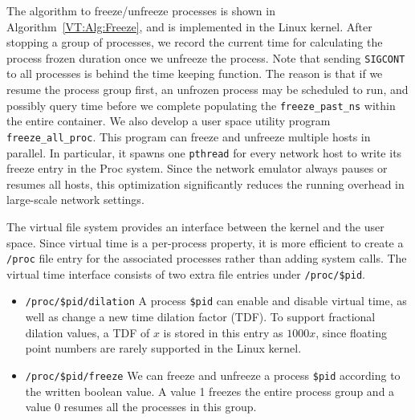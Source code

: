 The algorithm to freeze/unfreeze processes is shown in Algorithm~\ref{VT:Alg:Freeze},
and is implemented in the Linux kernel.
After stopping a group of processes, we record the  current time for calculating the process frozen duration once we unfreeze the process.
Note that sending \texttt{SIGCONT} to all processes is behind the time keeping function.
The reason is that if we resume the process group first, an unfrozen process may be scheduled to run,
and possibly query time before we complete populating the \texttt{freeze\_past\_ns} within the entire container.
We also develop a user space utility program \texttt{freeze\_all\_proc}.
This program can freeze and unfreeze multiple hosts in parallel.
In particular, it spawns one \texttt{pthread} for every network host to write its freeze entry in the Proc system.
Since the network emulator always pauses or resumes all hosts, this optimization significantly reduces the running overhead in large-scale network settings.

The virtual file system provides an interface between the kernel and the user space.
Since virtual time is a per-process property, it is more efficient to create a \texttt{/proc}
file entry for the associated processes rather than adding system calls.
The virtual time interface consists of two extra file entries under \texttt{/proc/\$pid}.
\begin{itemize}
    \item \texttt{/proc/\$pid/dilation} A process \texttt{\$pid} can enable and disable virtual time, as well as change a new time dilation factor (TDF).
        To support fractional dilation values, a TDF of $x$ is stored in this entry as $1000x$,  since floating point numbers are rarely supported in the Linux kernel.
    \item \texttt{/proc/\$pid/freeze} We can freeze and unfreeze a process \texttt{\$pid} according to the written boolean value.
        A value 1 freezes the entire process group and a value 0 resumes all the processes in this group.
\end{itemize}

